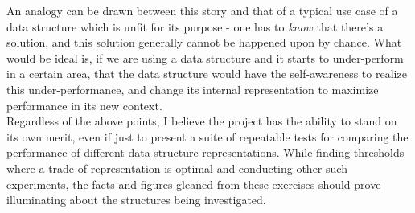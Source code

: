 \documentclass{report}
\begin{document}
An analogy can be drawn between this story and that of a typical use case of a
data structure which is unfit for its purpose - one has to \textit{know} that
there's a solution, and this solution generally cannot be happened upon by
chance. What would be ideal is, if we are using a data structure and it starts
to under-perform in a certain area, that the data structure would have the
self-awareness to realize this under-performance, and change its internal
representation to maximize performance in its new context. \\

Regardless of the above points, I believe the project has the ability to stand
on its own merit, even if just to present a suite of repeatable tests for
comparing the performance of different data structure representations. While
finding thresholds where a trade of representation is optimal and conducting
other such experiments, the facts and figures gleaned from these exercises
should prove illuminating about the structures being investigated.


\end{document}
